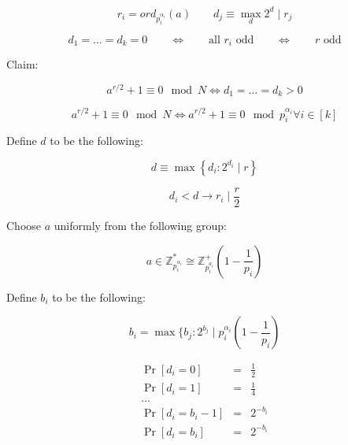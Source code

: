 \documentclass[12pt]{article}
\begin{document}
\begin{displaymath}
r_i = ord_{p_i^{\alpha_i}}(a) \qquad d_j \equiv \max_{d} 2^d \mid r_j
\end{displaymath}

\begin{displaymath}
d_1 = \ldots = d_k = 0 \qquad \Longleftrightarrow \qquad
\text{all } r_i \text{ odd} \qquad \Longleftrightarrow \qquad r \text{ odd}
\end{displaymath}

Claim:

\begin{displaymath}
a^{r/2} + 1 \equiv 0 \mod N \Longleftrightarrow d_1 = \ldots = d_k > 0
\end{displaymath}

\begin{displaymath}
a^{r/2} + 1 \equiv 0 \mod N \Longleftrightarrow
a^{r/2} + 1 \equiv 0 \mod p_i^{\alpha_i} \forall{i \in [k]}
\end{displaymath}

Define $d$ to be the following:

\begin{displaymath}
d \equiv \max \left\{ d_i : 2^{d_i} \mid r \right\}
\end{displaymath}

\begin{displaymath}
d_i < d \rightarrow r_i \mid \frac{r}{2}
\end{displaymath}

Choose $a$ uniformly from the following group:

\begin{displaymath}
a \in \mathbb{Z}^*_{p_i^{\alpha_i}} \cong
\mathbb{Z}^+_{p_i^{a_i}}(1 - \frac{1}{p_i})
\end{displaymath}

Define $b_i$ to be the following:

\begin{displaymath}
b_i = \max \{b_j : 2^{b_j} \mid p_i^{\alpha_i}(1 - \frac{1}{p_i})
\end{displaymath}

\begin{eqnarray*}
\Pr[d_i = 0] & = & \frac{1}{2}\\
\Pr[d_i = 1] & = & \frac{1}{4}\\
\ldots \\
\Pr[d_i = b_i - 1] & = & 2^{-b_i}\\
\Pr[d_i = b_i] & = & 2^{-b_i}
\end{eqnarray*}
\end{document}

